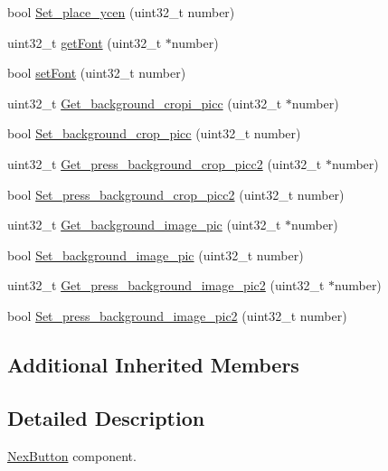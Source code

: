 \begin{DoxyCompactItemize}
\item 
bool \hyperlink{class_nex_button_a50c8c3678dd815ec8d4e111c79251b53}{Set\+\_\+place\+\_\+ycen} (uint32\+\_\+t number)
\item 
uint32\+\_\+t \hyperlink{class_nex_button_aba350b47585e53ece6c5f6a83fe58698}{get\+Font} (uint32\+\_\+t $\ast$number)
\item 
bool \hyperlink{class_nex_button_a0fc4598f87578079127ea33a303962ff}{set\+Font} (uint32\+\_\+t number)
\item 
uint32\+\_\+t \hyperlink{class_nex_button_a4be9d316efb2e3c537fdbcbc74c5597c}{Get\+\_\+background\+\_\+cropi\+\_\+picc} (uint32\+\_\+t $\ast$number)
\item 
bool \hyperlink{class_nex_button_a71fc4f96d4700bd50cd6c937a0bfd43d}{Set\+\_\+background\+\_\+crop\+\_\+picc} (uint32\+\_\+t number)
\item 
uint32\+\_\+t \hyperlink{class_nex_button_ab85cad116c12d13fef9fcfb7dd7ae32e}{Get\+\_\+press\+\_\+background\+\_\+crop\+\_\+picc2} (uint32\+\_\+t $\ast$number)
\item 
bool \hyperlink{class_nex_button_a8f63f08fa00609546011b0a66e7070a7}{Set\+\_\+press\+\_\+background\+\_\+crop\+\_\+picc2} (uint32\+\_\+t number)
\item 
uint32\+\_\+t \hyperlink{class_nex_button_a81c5a95583a9561f4a188b3e3e082280}{Get\+\_\+background\+\_\+image\+\_\+pic} (uint32\+\_\+t $\ast$number)
\item 
bool \hyperlink{class_nex_button_a926c09d2615d74ef67d577c2934e2982}{Set\+\_\+background\+\_\+image\+\_\+pic} (uint32\+\_\+t number)
\item 
uint32\+\_\+t \hyperlink{class_nex_button_afce48613e87933b48e3b29901633c341}{Get\+\_\+press\+\_\+background\+\_\+image\+\_\+pic2} (uint32\+\_\+t $\ast$number)
\item 
bool \hyperlink{class_nex_button_a2c1ded80df08c3726347b8acc68d1678}{Set\+\_\+press\+\_\+background\+\_\+image\+\_\+pic2} (uint32\+\_\+t number)
\end{DoxyCompactItemize}
\subsection*{Additional Inherited Members}


\subsection{Detailed Description}
\hyperlink{class_nex_button}{Nex\+Button} component.

